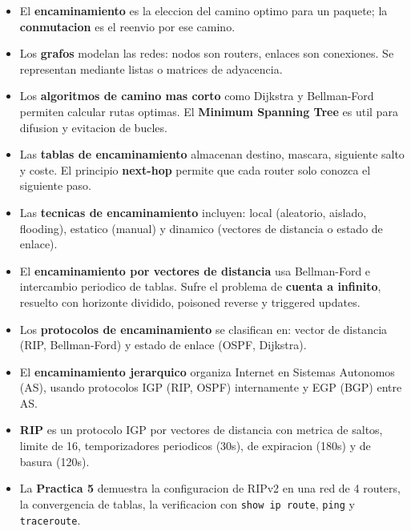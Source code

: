 \begin{itemize}
    \item El \textbf{encaminamiento} es la eleccion del camino optimo para un paquete; la \textbf{conmutacion} es el reenvio por ese camino.
    \item Los \textbf{grafos} modelan las redes: nodos son routers, enlaces son conexiones. Se representan mediante listas o matrices de adyacencia.
    \item Los \textbf{algoritmos de camino mas corto} como Dijkstra y Bellman-Ford permiten calcular rutas optimas. El \textbf{Minimum Spanning Tree} es util para difusion y evitacion de bucles.
    \item Las \textbf{tablas de encaminamiento} almacenan destino, mascara, siguiente salto y coste. El principio \textbf{next-hop} permite que cada router solo conozca el siguiente paso.
    \item Las \textbf{tecnicas de encaminamiento} incluyen: local (aleatorio, aislado, flooding), estatico (manual) y dinamico (vectores de distancia o estado de enlace).
    \item El \textbf{encaminamiento por vectores de distancia} usa Bellman-Ford e intercambio periodico de tablas. Sufre el problema de \textbf{cuenta a infinito}, resuelto con horizonte dividido, poisoned reverse y triggered updates.
    \item Los \textbf{protocolos de encaminamiento} se clasifican en: vector de distancia (RIP, Bellman-Ford) y estado de enlace (OSPF, Dijkstra).
    \item El \textbf{encaminamiento jerarquico} organiza Internet en Sistemas Autonomos (AS), usando protocolos IGP (RIP, OSPF) internamente y EGP (BGP) entre AS.
    \item \textbf{RIP} es un protocolo IGP por vectores de distancia con metrica de saltos, limite de 16, temporizadores periodicos (30s), de expiracion (180s) y de basura (120s).
    \item La \textbf{Practica 5} demuestra la configuracion de RIPv2 en una red de 4 routers, la convergencia de tablas, la verificacion con \texttt{show ip route}, \texttt{ping} y \texttt{traceroute}.
\end{itemize}

